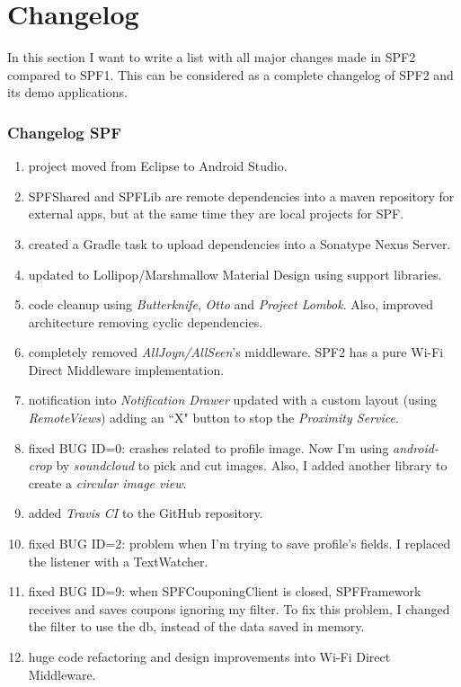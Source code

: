 \chapter{Changelog}
\label{changelog}

In this section I want to write a list with all major changes made in SPF2 compared to SPF1. This can be considered as a complete changelog of SPF2 and its demo applications.

\subsection*{Changelog SPF}
\begin{enumerate}
	\item project moved from Eclipse to Android Studio.
	\item SPFShared and SPFLib are remote dependencies into a maven repository for external apps, but at the same time they are local projects for SPF.
	\item created a Gradle task to upload dependencies into a Sonatype Nexus Server.
	\item updated to Lollipop/Marshmallow Material Design using support libraries.
	\item code cleanup using \emph{Butterknife}, \emph{Otto} and \emph{Project Lombok}. Also, improved architecture removing cyclic dependencies.
	\item completely removed \emph{AllJoyn/AllSeen}'s middleware. SPF2 has a pure Wi-Fi Direct Middleware implementation.
	\item notification into \emph{Notification Drawer} updated with a custom layout (using \emph{RemoteViews}) adding an ``X" button to stop the \emph{Proximity Service}.
	\item fixed BUG ID=0: crashes related to profile image. Now I'm using \emph{android-crop} by \emph{soundcloud} to pick and cut images. Also, I added another library to create a \emph{circular image view}.
	\item added \emph{Travis CI} to the GitHub repository.
	\item fixed BUG ID=2: problem when I'm trying to save profile's fields. I replaced the listener with a \textsf{TextWatcher}.
	\item fixed BUG ID=9: when \textsf{SPFCouponingClient} is closed, \textsf{SPFFramework} receives and saves coupons ignoring my filter. To fix this problem, I changed the filter to use the db, instead of the data saved in memory.
	\item huge code refactoring and design improvements into Wi-Fi Direct Middleware.

\end{enumerate}

